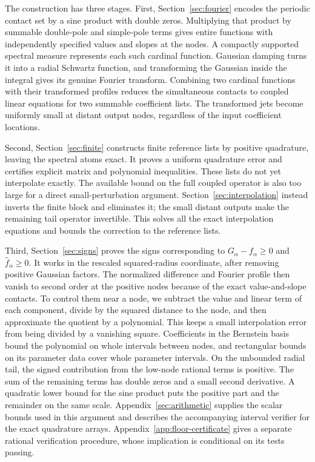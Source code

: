 The construction has three stages.  First, Section~\ref{sec:fourier}
encodes the periodic contact set by a sine product with double zeros.
Multiplying that product by summable double-pole and simple-pole terms gives
entire functions with independently specified values and slopes at the
nodes.  A compactly supported spectral measure represents each such cardinal
function.  Gaussian damping turns it into a radial Schwartz function, and transforming
the Gaussian inside the integral gives its genuine Fourier transform.
Combining two cardinal functions with their transformed profiles reduces
the simultaneous contacts to coupled linear equations for two summable
coefficient lists.  The transformed jets become uniformly small at distant
output nodes, regardless of the input coefficient locations.

Second, Section~\ref{sec:finite} constructs finite reference lists by
positive quadrature, leaving the spectral atoms exact.  It proves a uniform
quadrature error and certifies explicit matrix and polynomial inequalities.
These lists do not yet interpolate exactly.  The available bound on the
full coupled operator is also too large for a direct small-perturbation
argument.  Section~\ref{sec:interpolation} instead inverts the finite block
and eliminates it; the small distant outputs make the remaining tail
operator invertible.  This solves all the exact interpolation equations and
bounds the correction to the reference lists.

Third, Section~\ref{sec:signs} proves the signs corresponding to
$G_\alpha-f_\alpha\ge0$ and $\widehat f_\alpha\ge0$.  It works in the
rescaled squared-radius coordinate, after removing positive Gaussian factors.
The normalized difference and Fourier profile then vanish to second order
at the positive nodes because of the exact value-and-slope contacts.  To control them
near a node, we subtract the value and linear term of each component, divide
by the squared distance to the node, and then approximate the quotient by a
polynomial.  This keeps a small interpolation error from being divided by a vanishing square.
Coefficients in the Bernstein basis bound the polynomial on whole intervals
between nodes, and rectangular bounds on its parameter data cover whole
parameter intervals.  On the unbounded radial tail, the signed contribution
from the low-node rational terms is positive.  The sum of the remaining
terms has double zeros and a small second derivative.  A quadratic lower
bound for the sine product puts the positive part and the remainder on the
same scale.  Appendix~\ref{sec:arithmetic} supplies the scalar bounds used
in this argument and describes the accompanying interval verifier for the
exact quadrature arrays.  Appendix~\ref{app:floor-certificate} gives a
separate rational verification procedure, whose implication is conditional
on its tests passing.

